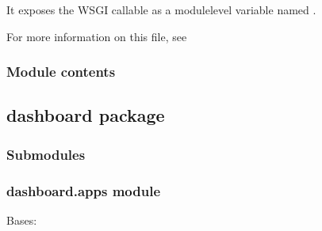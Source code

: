 \documentclass[letterpaper,10pt,english]{sphinxmanual}
\begin{document}
It exposes the WSGI callable as a module\sphinxhyphen{}level variable named .

For more information on this file, see


\subsubsection{Module contents}
\label{\detokenize{cobalt:module-cobalt}}\label{\detokenize{cobalt:module-contents}}

\subsection{dashboard package}
\label{\detokenize{dashboard:dashboard-package}}\label{\detokenize{dashboard::doc}}

\subsubsection{Submodules}
\label{\detokenize{dashboard:submodules}}

\subsubsection{dashboard.apps module}
\label{\detokenize{dashboard:module-dashboard.apps}}\label{\detokenize{dashboard:dashboard-apps-module}}

\begin{fulllineitems}
\label{\detokenize{dashboard:dashboard.apps.DashboardConfig}}
Bases: 

\begin{fulllineitems}
\label{\detokenize{dashboard:dashboard.apps.DashboardConfig.name}}
\end{fulllineitems}


\end{fulllineitems}
\end{document}
